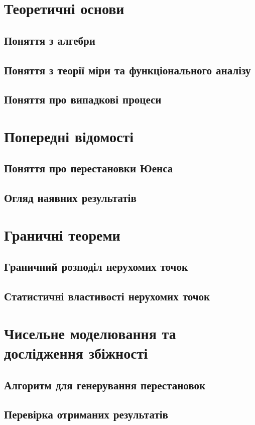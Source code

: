 





\tableofcontents
{}
    
\chapter{Теоретичні основи}
    \section{Поняття з алгебри}
        
    \section{Поняття з теорії міри та функціонального аналізу}
        
    \section{Поняття про випадкові процеси}
        
\chapter{Попередні відомості}
    \section{Поняття про перестановки Юенса}
    \section{Огляд наявних результатів}
\chapter{Граничні теореми}
    \section{Граничний розподіл нерухомих точок}
        
    \section{Статистичні властивості нерухомих точок}
        
\chapter{Чисельне моделювання та дослідження збіжності}
    \section{Алгоритм для генерування перестановок}
    \section{Перевірка отриманих результатів}
\newpage


